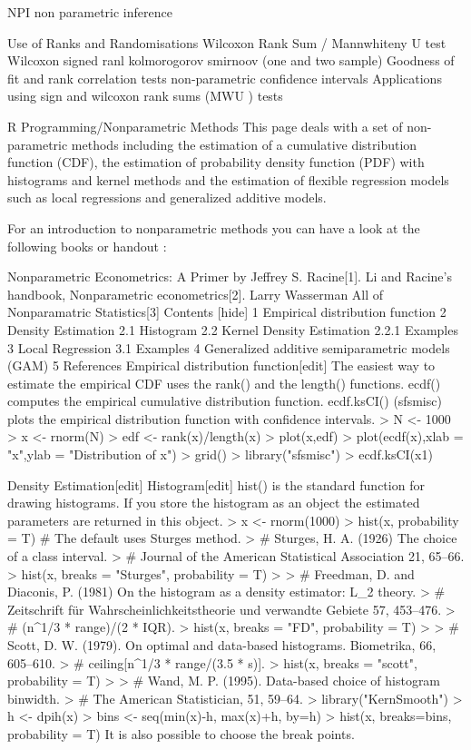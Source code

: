
NPI non parametric inference

Use of Ranks and Randomisations
Wilcoxon Rank Sum  / Mannwhiteny U test
Wilcoxon signed ranl
kolmorogorov smirnoov (one and two sample)
Goodness of fit and rank correlation tests
non-parametric confidence intervals
Applications using sign and wilcoxon rank sums (MWU ) tests

R Programming/Nonparametric Methods
This page deals with a set of non-parametric methods including the estimation of a cumulative distribution function (CDF), the estimation of probability density function (PDF) with histograms and kernel methods and the estimation of flexible regression models such as local regressions and generalized additive models.

For an introduction to nonparametric methods you can have a look at the following books or handout :

Nonparametric Econometrics: A Primer by Jeffrey S. Racine[1].
Li and Racine's handbook, Nonparametric econometrics[2].
Larry Wasserman All of Nonparamatric Statistics[3]
Contents  [hide] 
1 Empirical distribution function
2 Density Estimation
2.1 Histogram
2.2 Kernel Density Estimation
2.2.1 Examples
3 Local Regression
3.1 Examples
4 Generalized additive semiparametric models (GAM)
5 References
Empirical distribution function[edit]
The easiest way to estimate the empirical CDF uses the rank() and the length() functions.
ecdf() computes the empirical cumulative distribution function.
ecdf.ksCI() (sfsmisc) plots the empirical distribution function with confidence intervals.
> N <- 1000
> x <- rnorm(N)
> edf <- rank(x)/length(x)
> plot(x,edf)
> plot(ecdf(x),xlab = "x",ylab = "Distribution of x")
> grid()
> library("sfsmisc")
> ecdf.ksCI(x1)


Density Estimation[edit]
Histogram[edit]
hist() is the standard function for drawing histograms. If you store the histogram as an object the estimated parameters are returned in this object.
> x <- rnorm(1000)
> hist(x, probability = T) # The default uses Sturges method.
> # Sturges, H. A. (1926) The choice of a class interval.
> # Journal of the American Statistical Association 21, 65–66. 
> hist(x, breaks = "Sturges", probability = T)
> 
> # Freedman, D. and Diaconis, P. (1981) On the histogram as a density estimator: L_2 theory.
> # Zeitschrift für Wahrscheinlichkeitstheorie und verwandte Gebiete 57, 453–476. 
> # (n^1/3 * range)/(2 * IQR).
> hist(x, breaks = "FD", probability = T)
> 
> # Scott, D. W. (1979). On optimal and data-based histograms. Biometrika, 66, 605–610. 
> # ceiling[n^1/3 * range/(3.5 * s)].
> hist(x, breaks = "scott", probability = T)
> 
> # Wand, M. P. (1995). Data-based choice of histogram binwidth.
> # The American Statistician, 51, 59–64. 
> library("KernSmooth")
> h <- dpih(x)
> bins <- seq(min(x)-h, max(x)+h, by=h)
> hist(x, breaks=bins, probability = T)
It is also possible to choose the break points.

